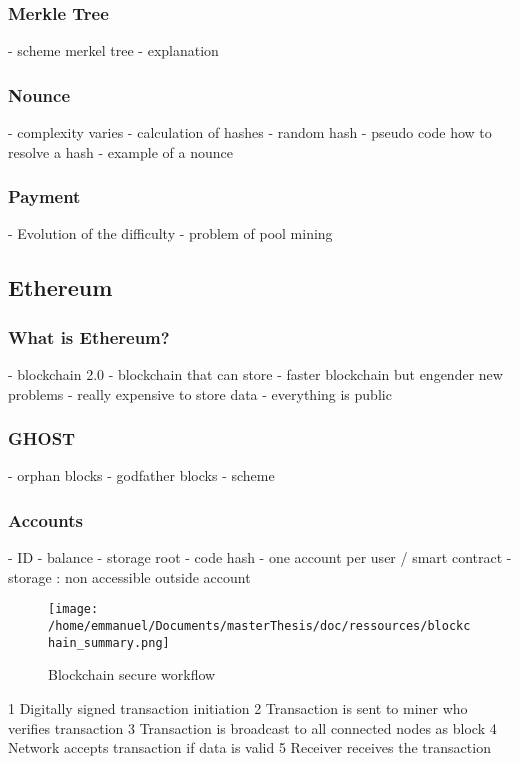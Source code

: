 \subsubsection{Merkle Tree}
- scheme merkel tree
\newline
- explanation
\subsubsection{Nounce}
- complexity varies
\newline
- calculation of hashes
\newline 
- random hash
\newline
- pseudo code how to resolve a hash
\newline
- example of a nounce
\subsubsection{Payment}
- Evolution of the difficulty
\newline
- problem of pool mining
\subsection{Ethereum}
\subsubsection{What is Ethereum?}
- blockchain 2.0
\newline
- blockchain that can store 
\newline
- faster blockchain but engender new problems
\newline
- really expensive to store data
\newline
- everything is public
\subsubsection{GHOST}
- orphan blocks
- godfather blocks
- scheme
 \subsubsection{Accounts}
 - ID
 \newline
 - balance
 \newline
 - storage root
 \newline
 - code hash
 \newline
 - one account per user / smart contract
 \newline
 - storage : non accessible outside account
 \newline
 \begin{figure}[htp]
\centering
\texttt{[image: /home/emmanuel/Documents/masterThesis/doc/ressources/blockchain\_summary.png]}
\caption{Blockchain secure workflow}
\label{}
\end{figure}
 1 	Digitally signed transaction initiation
2 	Transaction is sent to miner who verifies transaction
3 	Transaction is broadcast to all connected nodes as block
4 	Network accepts transaction if data is valid
5 	Receiver receives the transaction
